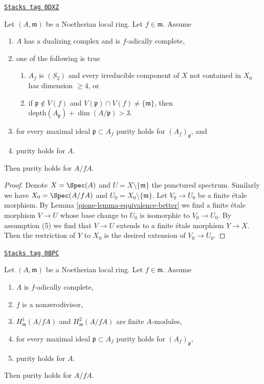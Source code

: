 \begin{lemma}
\label{pione-lemma-purity-inherited-by-hypersurface-better}
\href{https://stacks.math.columbia.edu/tag/0DXZ}{\texttt{Stacks tag 0DXZ}}

Let $(A, \mathfrak m)$ be a Noetherian local ring.
Let $f \in \mathfrak m$. Assume
\begin{enumerate}
\item $A$ has a dualizing complex and is $f$-adically complete,
\item one of the following is true
\begin{enumerate}
\item $A_f$ is $(S_2)$ and every irreducible component of $X$
not contained in $X_0$ has dimension $\geq 4$, or
\item if $\mathfrak p \not \in V(f)$ and
$V(\mathfrak p) \cap V(f) \not = \{\mathfrak m\}$, then
$\text{depth}(A_\mathfrak p) + \dim(A/\mathfrak p) > 3$.
\end{enumerate}
\item for every maximal ideal $\mathfrak p \subset A_f$
purity holds for $(A_f)_\mathfrak p$, and
\item purity holds for $A$.
\end{enumerate}
Then purity holds for $A/fA$.
\end{lemma}

\begin{proof}

Denote $X = \Spec(A)$ and $U = X \setminus \{\mathfrak m\}$
the punctured spectrum. Similarly we have $X_0 = \Spec(A/fA)$
and $U_0 = X_0 \setminus \{\mathfrak m\}$.
Let $V_0 \to U_0$ be a finite \'etale morphism. By
Lemma \ref{pione-lemma-equivalence-better}
we find a finite \'etale morphism $V \to U$
whose base change to $U_0$
is isomorphic to $V_0 \to U_0$.
By assumption (5) we find that $V \to U$ extends
to a finite \'etale morphism $Y \to X$. Then the restriction of
$Y$ to $X_0$ is the desired extension of $V_0 \to U_0$.
\end{proof}

\begin{lemma}
\label{pione-lemma-purity-inherited-by-hypersurface}
\href{https://stacks.math.columbia.edu/tag/0BPC}{\texttt{Stacks tag 0BPC}}

Let $(A, \mathfrak m)$ be a Noetherian local ring.
Let $f \in \mathfrak m$. Assume
\begin{enumerate}
\item $A$ is $f$-adically complete,
\item $f$ is a nonzerodivisor,
\item $H^1_\mathfrak m(A/fA)$ and $H^2_\mathfrak m(A/fA)$ are finite
$A$-modules,
\item for every maximal ideal $\mathfrak p \subset A_f$
purity holds for $(A_f)_\mathfrak p$,
\item purity holds for $A$.
\end{enumerate}
Then purity holds for $A/fA$.
\end{lemma}


